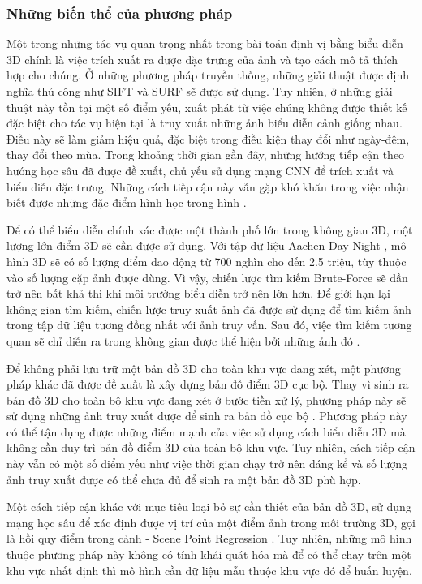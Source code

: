 \subsubsection*{Những biến thể của phương pháp}

Một trong những tác vụ quan trọng nhất trong bài toán định vị bằng biểu diễn 3D chính là việc trích xuất ra được đặc trưng của ảnh và tạo cách mô tả thích hợp cho chúng. Ở những phương pháp truyền thống, những giải thuật được định nghĩa thủ công như SIFT \cite{lowe2004distinctive} và SURF \cite{bay2006surf} sẽ được sử dụng. Tuy nhiên, ở những giải thuật này tồn tại một số điểm yếu, xuất phát từ việc chúng không được thiết kế đặc biệt cho tác vụ hiện tại là truy xuất những ảnh biểu diễn cảnh giống nhau. Điều này sẽ làm giảm hiệu quả, đặc biệt trong điều kiện thay đổi như ngày-đêm, thay đổi theo mùa. Trong khoảng thời gian gần đây, những hướng tiếp cận theo hướng học sâu đã được đề xuất, chủ yếu sử dụng mạng CNN để trích xuất và biểu diễn đặc trưng. Những cách tiếp cận này vẫn gặp khó khăn trong việc nhận biết được những đặc điểm hình học trong hình \cite{zhou2020learn}.

Để có thể biểu diễn chính xác được một thành phố lớn trong không gian 3D, một lượng lớn điểm 3D sẽ cần được sử dụng. Với tập dữ liệu Aachen Day-Night \cite{sattler2018benchmarking}, mô hình 3D sẽ có số lượng điểm dao động từ 700 nghìn cho đến 2.5 triệu, tùy thuộc vào số lượng cặp ảnh được dùng. Vì vậy, chiến lược tìm kiếm Brute-Force sẽ dần trở nên bất khả thi khi môi trường biểu diễn trở nên lớn hơn. Để giới hạn lại không gian tìm kiếm, chiến lược truy xuất ảnh đã được sử dụng để tìm kiếm ảnh trong tập dữ liệu tương đồng nhất với ảnh truy vấn. Sau đó, việc tìm kiếm tương quan sẽ chỉ diễn ra trong không gian được thể hiện bởi những ảnh đó \cite{sarlin2019coarse}.

Để không phải lưu trữ một bản đồ 3D cho toàn khu vực đang xét, một phương pháp khác đã được đề xuất là xây dựng bản đồ điểm 3D cục bộ. Thay vì sinh ra bản đồ 3D cho toàn bộ khu vực đang xét ở bước tiền xử lý, phương pháp này sẽ sử dụng những ảnh truy xuất được để sinh ra bản đồ cục bộ \cite{sattler2017large}. Phương pháp này có thể tận dụng được những điểm mạnh của việc sử dụng cách biểu diễn 3D mà không cần duy trì bản đồ điểm 3D của toàn bộ khu vực. Tuy nhiên, cách tiếp cận này vẫn có một số điểm yếu như việc thời gian chạy trở nên đáng kể và số lượng ảnh truy xuất được có thể chưa đủ để sinh ra một bản đồ 3D phù hợp.

Một cách tiếp cận khác với mục tiêu loại bỏ sự cần thiết của bản đồ 3D, sử dụng mạng học sâu để xác định được vị trí của một điểm ảnh trong môi trường 3D, gọi là hồi quy điểm trong cảnh - Scene Point Regression \cite{brachmann2021visual}. Tuy nhiên, những mô hình thuộc phương pháp này không có tính khái quát hóa mà để có thể chạy trên một khu vực nhất định thì mô hình cần dữ liệu mẫu thuộc khu vực đó để huấn luyện.

